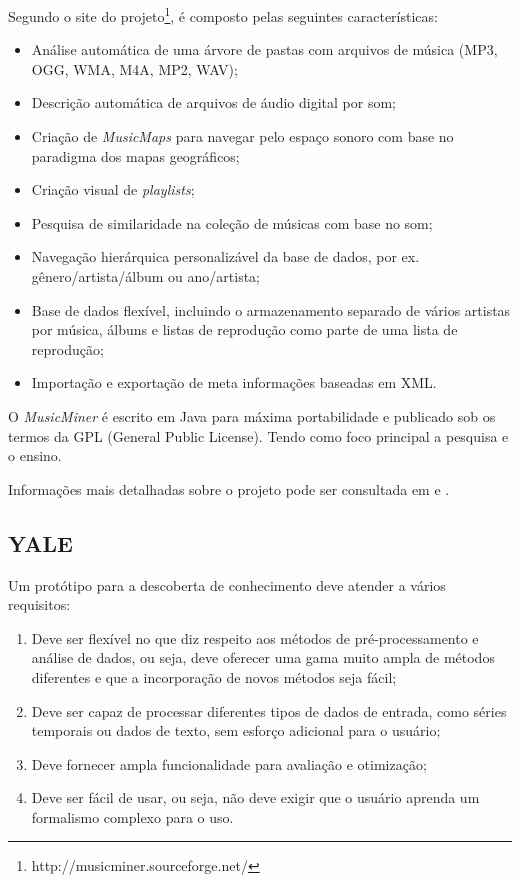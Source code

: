 Segundo o site do projeto\footnote{http://musicminer.sourceforge.net/}, é composto pelas seguintes características:

\begin{itemize}
    \item Análise automática de uma árvore de pastas com arquivos de música (MP3, OGG, WMA, M4A, MP2, WAV);
    \item Descrição automática de arquivos de áudio digital por som;
    \item Criação de \textit{MusicMaps} para navegar pelo espaço sonoro com base no paradigma dos mapas geográficos;
    \item Criação visual de \textit{playlists};
    \item Pesquisa de similaridade na coleção de músicas com base no som;
    \item Navegação hierárquica personalizável da base de dados, por ex. gênero/artista/álbum ou ano/artista;
    \item Base de dados flexível, incluindo o armazenamento separado de vários artistas por música, álbuns e listas de reprodução como parte de uma lista de reprodução;
    \item Importação e exportação de meta informações baseadas em XML.
\end{itemize}

O \textit{MusicMiner} é escrito em Java para máxima portabilidade e publicado sob os termos da GPL (General Public License). Tendo como foco principal a pesquisa e o ensino.

Informações mais detalhadas sobre o projeto pode ser consultada em \cite{morchen2005} e \cite{musicminer}.

\subsection{YALE}
Um protótipo para a descoberta de conhecimento deve atender a vários requisitos:

\begin{enumerate}
    \item Deve ser flexível no que diz respeito aos métodos de pré-processamento e análise de dados, ou seja, deve oferecer uma gama muito ampla de métodos diferentes e que a incorporação de novos métodos seja fácil;
    \item Deve ser capaz de processar diferentes tipos de dados de entrada, como séries temporais ou dados de texto, sem esforço adicional para o usuário;
    \item Deve fornecer ampla funcionalidade para avaliação e otimização;
    \item Deve ser fácil de usar, ou seja, não deve exigir que o usuário aprenda um formalismo complexo para o uso.
    
\end{enumerate}

